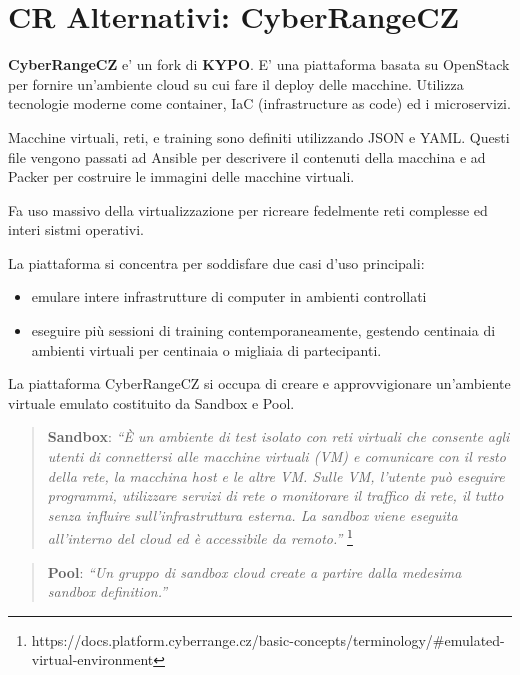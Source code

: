 \section{CR Alternativi:
CyberRangeCZ}\label{cr-alternativi-cyberrangecz}

\textbf{CyberRangeCZ} e' un fork di \textbf{KYPO}. E' una piattaforma
basata su OpenStack per fornire un'ambiente cloud su cui fare il deploy
delle macchine. Utilizza tecnologie moderne come container, IaC
(infrastructure as code) ed i microservizi.

Macchine virtuali, reti, e training sono definiti utilizzando JSON e
YAML. Questi file vengono passati ad Ansible per descrivere il contenuti
della macchina e ad Packer per costruire le immagini delle macchine
virtuali.

Fa uso massivo della virtualizzazione per ricreare fedelmente reti
complesse ed interi sistmi operativi.

La piattaforma si concentra per soddisfare due casi d'uso principali:

\begin{itemize}
\tightlist
\item
  emulare intere infrastrutture di computer in ambienti controllati
\item
  eseguire più sessioni di training contemporaneamente, gestendo
  centinaia di ambienti virtuali per centinaia o migliaia di
  partecipanti.
\end{itemize}

La piattaforma CyberRangeCZ si occupa di creare e approvvigionare
un'ambiente virtuale emulato costituito da Sandbox e Pool.

\begin{quote}
\textbf{Sandbox}: \emph{``È un ambiente di test isolato con reti
virtuali che consente agli utenti di connettersi alle macchine virtuali
(VM) e comunicare con il resto della rete, la macchina host e le altre
VM. Sulle VM, l'utente può eseguire programmi, utilizzare servizi di
rete o monitorare il traffico di rete, il tutto senza influire
sull'infrastruttura esterna. La sandbox viene eseguita all'interno del
cloud ed è accessibile da remoto.''} \footnote{\label{fn:ref_11}https://docs.platform.cyberrange.cz/basic-concepts/terminology/\#emulated-virtual-environment}
\end{quote}

\begin{quote}
\textbf{Pool}: \emph{``Un gruppo di sandbox cloud create a partire dalla
medesima sandbox definition.''} 
\end{quote}


